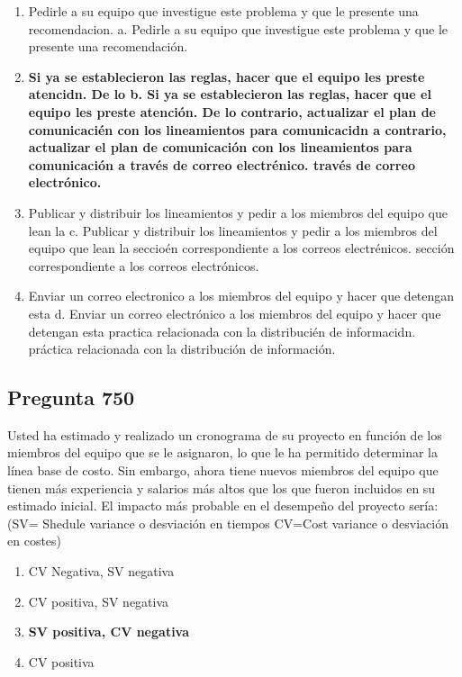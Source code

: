 \documentclass[11pt,a4paper]{article}
\begin{document}
\begin{enumerate}[label=\alph*)]
  \item Pedirle a su equipo que investigue este problema y que le presente una recomendacion. a. Pedirle a su equipo que investigue este problema y que le presente una recomendación.
  \item \textbf{Si ya se establecieron las reglas, hacer que el equipo les preste atencidn. De lo b. Si ya se establecieron las reglas, hacer que el equipo les preste atención. De lo contrario, actualizar el plan de comunicacién con los lineamientos para comunicacidn a contrario, actualizar el plan de comunicación con los lineamientos para comunicación a través de correo electrénico. través de correo electrónico.}
  \item Publicar y distribuir los lineamientos y pedir a los miembros del equipo que lean la c. Publicar y distribuir los lineamientos y pedir a los miembros del equipo que lean la seccioén correspondiente a los correos electrénicos. sección correspondiente a los correos electrónicos.
  \item Enviar un correo electronico a los miembros del equipo y hacer que detengan esta d. Enviar un correo electrónico a los miembros del equipo y hacer que detengan esta practica relacionada con la distribucién de informacidn. práctica relacionada con la distribución de información.
\end{enumerate}

\subsection*{Pregunta 750}
Usted ha estimado y realizado un cronograma de su proyecto en función de los miembros del equipo que se le asignaron, lo que le ha permitido determinar la línea base de costo. Sin embargo, ahora tiene nuevos miembros del equipo que tienen más experiencia y salarios más altos que los que fueron incluidos en su estimado inicial. El impacto más probable en el desempeño del proyecto sería: (SV= Shedule variance o desviación en tiempos CV=Cost variance o desviación en costes)

\begin{enumerate}[label=\alph*)]
  \item CV Negativa, SV negativa
  \item CV positiva, SV negativa
  \item \textbf{SV positiva, CV negativa}
  \item CV positiva
\end{enumerate}
\end{document}
